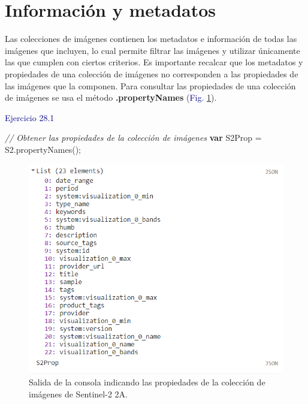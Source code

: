 \documentclass[
  12pt,
  letterpaper,
  twoside]{book}
\newenvironment{Shaded}{\begin{snugshade}}{\end{snugshade}}
\newcommand{\CommentTok}[1]{\textcolor[rgb]{0.24,0.58,0.00}{\textit{#1}}}
\newcommand{\ControlFlowTok}[1]{\textcolor[rgb]{0.00,0.00,0.00}{\textbf{#1}}}
\newcommand{\FunctionTok}[1]{\textcolor[rgb]{0.48,0.12,0.64}{#1}}
\newcommand{\NormalTok}[1]{#1}
\newcommand{\OperatorTok}[1]{\textcolor[rgb]{0.00,0.00,0.00}{#1}}
\newcommand\boldpurple[1]{\textcolor{darkpurple}{\textbf{#1}}}
\begin{document}
\hypertarget{informaciuxf3n-y-metadatos-4}{%
\section{Información y metadatos}\label{informaciuxf3n-y-metadatos-4}}

Las colecciones de imágenes contienen los metadatos e información de todas las imágenes que incluyen, lo cual permite filtrar las imágenes y utilizar únicamente las que cumplen con ciertos criterios. Es importante recalcar que los metadatos y propiedades de una colección de imágenes no corresponden a las propiedades de las imágenes que la componen. Para consultar las propiedades de una colección de imágenes se usa el método \boldpurple{.propertyNames} (\textcolor{darkblue}{Fig.} \ref{fig:f101}).

\newpage

\textcolor{darkblue}{Ejercicio 28.1}

\begin{Shaded}
\begin{Highlighting}[]
\CommentTok{// Obtener las propiedades de la colección de imágenes}
\ControlFlowTok{var}\NormalTok{ S2Prop }\OperatorTok{=}\NormalTok{ S2}\OperatorTok{.}\FunctionTok{propertyNames}\NormalTok{()}\OperatorTok{;}
\end{Highlighting}
\end{Shaded}

\begin{figure}[H]

{\centering \includegraphics[width=0.8\linewidth]{Img/s2properties} 

}

\caption{Salida de la consola indicando las propiedades de la colección de imágenes de Sentinel-2 2A.}\label{fig:f101}
\end{figure}
\end{document}
